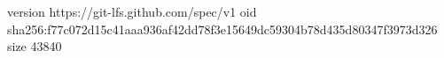 version https://git-lfs.github.com/spec/v1
oid sha256:f77c072d15c41aaa936af42dd78f3e15649dc59304b78d435d80347f3973d326
size 43840
